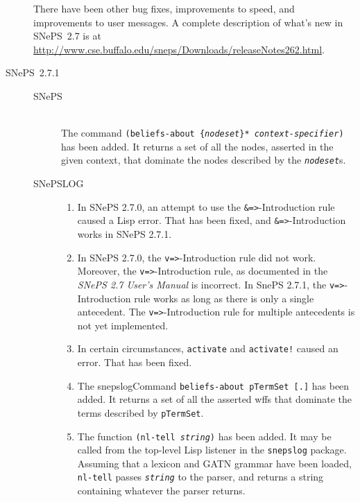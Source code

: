 \documentclass{book}
\begin{document}
\begin{description}
  There have been other bug fixes, improvements to speed, and
  improvements to user messages.  A complete description of what's new
  in SNePS~2.7 is at
  \url{http://www.cse.buffalo.edu/sneps/Downloads/releaseNotes262.html}.

\item[SNePS~2.7.1]\mbox{}
  \begin{description}
\item[SNePS]\mbox{}\\
The command \texttt{(beliefs-about \{{\it nodeset}\}*
{\it context-specifier})} has been added.  It returns a set of
all the nodes, asserted in the given context, that dominate the nodes
described by the \texttt{{\it nodeset}}s.

\item[SNePSLOG]\mbox{}
\begin{enumerate}

\item In SNePS 2.7.0, an attempt to use the \texttt{\&=>}-Introduction rule
  caused a Lisp error.  That has been fixed, and \texttt{\&=>}-Introduction
  works in SNePS 2.7.1.

\item In SNePS 2.7.0, the \texttt{v=>}-Introduction rule did not work.
  Moreover, the \texttt{v=>}-Introduction rule, as documented in the
  \textit{SNePS 2.7 User's Manual} is incorrect.  In SnePS 2.7.1, the
    \texttt{v=>}-Introduction rule works as long as there is only a single
    antecedent.  The \texttt{v=>}-Introduction rule for multiple antecedents is
    not yet implemented.

\item In certain circumstances, \texttt{activate} and
\texttt{activate!} caused an error.  That has been fixed.

\item  The snepslogCommand \texttt{beliefs-about pTermSet [.]} has
been added.  It returns a set of all the asserted wffs that dominate
the terms described by \texttt{pTermSet}.

\item  The function \texttt{(nl-tell {\it string})} has been added.  It may
	      be called from the top-level Lisp listener in the
	      \texttt{snepslog} package.  Assuming that a lexicon and GATN
	      grammar have been loaded, \texttt{nl-tell} passes
	      \texttt{{\it string}} to the parser, and returns a string
	      containing whatever the parser returns.


\end{enumerate}
\end{description}
\end{description}
\end{document}
